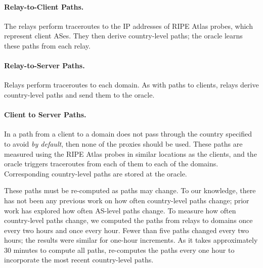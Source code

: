 \paragraph{Relay-to-Client Paths.} The relays perform
traceroutes to the IP addresses of RIPE Atlas probes, which 
represent client ASes.  They then derive country-level paths; the
oracle learns these paths from each relay.  

\paragraph{Relay-to-Server Paths.} Relays perform 
traceroutes to each domain.  As with paths to clients,
relays derive country-level paths and send them to the oracle.

\paragraph{Client to Server Paths.} In a path from a client to a 
domain does not pass through the country specified to avoid {\it by default}, 
then none of the proxies should be used.  
These paths are measured using the RIPE Atlas probes in similar
locations as the clients, and the oracle triggers traceroutes from
each of them to each of the domains.  Corresponding country-level
paths are stored at the oracle.

These paths must be re-computed 
as paths may change.  To our knowledge, there has not been any previous work 
on how often country-level paths change; prior work has explored how often 
AS-level paths change.  To measure how often country-level paths change, we 
computed the paths from relays to domains once every two hours and once every 
hour.  Fewer than five paths changed every two hours; the 
results were similar for one-hour increments.  As it takes approximately 30 minutes to 
compute all paths, \system{} re-computes the paths every one hour to incorporate 
the most recent country-level paths.



